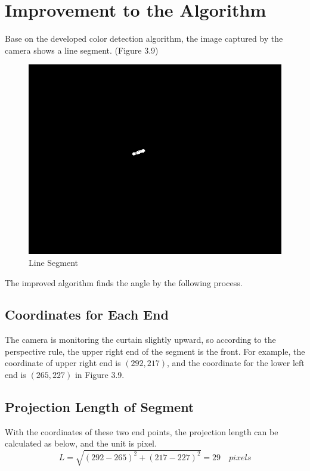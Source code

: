 \documentclass[letterpaper,12pt,oneside]{book}
\begin{document}
		\section{Improvement to the Algorithm}
		Base on the developed color detection algorithm, the image captured by the camera shows a line segment. (Figure 3.9)
		\begin{figure}[ht!]
			\begin{center}
				\includegraphics[scale = 0.6]{segment.png}
				\caption{Line Segment}
			\end{center}
		\end{figure}
		The improved algorithm finds the angle by the following process. 
		\subsection{Coordinates for Each End}
		
		The camera is monitoring the curtain slightly upward, so according to the perspective rule, the upper right end of the segment is the front. For example, the coordinate of upper right end is $(292,217)$, and the coordinate for the lower left end is $(265, 227)$ in Figure 3.9.
			
		\subsection{Projection Length of Segment}
			
		With the coordinates of these two end points, the projection length can be calculated as below, and the unit is pixel. 
		\begin{equation}
			L = \sqrt{(292-265)^2+(217-227)^2} = 29 \quad pixels
		\end{equation}
			
\end{document}
